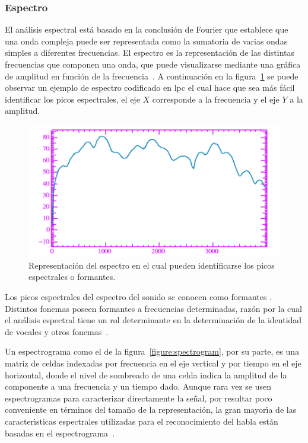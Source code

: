 \subsubsection{Espectro}
El an\'alisis espectral est\'a basado en la conclusi\'on de Fourier que establece que una onda compleja puede ser 
representada como la sumatoria de varias ondas simples a diferentes frecuencias. El espectro es la representaci\'on de las 
distintas frecuencias que componen una onda, que puede visualizarse mediante una gr\'afica de amplitud en funci\'on de la 
\mbox{frecuencia \cite{Jurafsky}}. A continuaci\'on en la figura~\ref{figure:formants} se puede observar un ejemplo
de espectro codificado en \gls{lpc} \cite{KesarkarFeature2003} el cual hace que sea m\'as f\'acil identificar los picos espectrales,
el eje $X$ corresponde a la frecuencia y el eje $Y$ a la amplitud.

\begin{figure}[H]
\centering
\includegraphics[width=0.6\linewidth]{./graphics/formants.png}
\caption{Representaci\'on del espectro en el cual pueden identificarse los picos espectrales o formantes. \cite{Jurafsky}}
\label{figure:formants}
\end{figure}

Los picos espectrales del espectro del sonido se conocen como formantes \cite{Fant1960acoustic}. Distintos fonemas poseen 
formantes a frecuencias determinadas, raz\'on por la cual el an\'alisis espectral tiene un rol determinante en la 
determinaci\'on de la identidad de vocales y otros \mbox{fonemas \cite{LadefogedCourse2006}}.

Un espectrograma como el de la figura~\ref{figure:spectrogram}, por su parte, es una matriz de celdas indexadas por frecuencia en el eje vertical y por tiempo en el eje 
horizontal, donde el nivel de sombreado de una celda indica la amplitud de la componente a una frecuencia y un tiempo 
dado. Aunque rara vez se usen espectrogramas para caracterizar directamente la se\~nal, por resultar poco conveniente en t\'erminos del 
tama\~no de la representaci\'on, la gran mayor{\'\i}a de las caracter{\'\i}sticas espectrales utilizadas para el reconocimiento del 
habla est\'an basadas en el \mbox{espectrograma \cite{Ellis08anintroduction}}.

